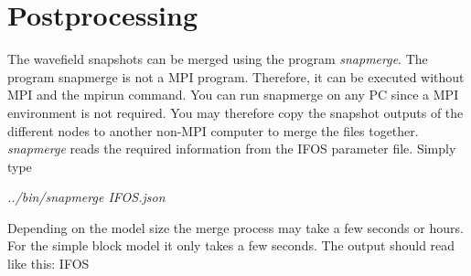 \section{Postprocessing}  
The wavefield snapshots can be merged using the program \textit{snapmerge}. The program snapmerge is not a MPI program. Therefore, it can be executed without MPI and the mpirun command. You can run snapmerge on any PC since a MPI environment is not required. You may therefore copy the snapshot outputs of the different nodes to another non-MPI computer to merge the files together. \textit{snapmerge} reads the required information from the IFOS parameter file. Simply type
\newline

\textit{../bin/snapmerge IFOS.json  }
\newline


Depending on the model size the merge process may take a few seconds or hours. For the simple block model it only takes a few seconds. The output should read like this:
{\color{blue}{\begin{verbatim}
 pressure (files: ./snap/test.bin.p.??? ).

 writing merged snapshot file to  ./snap/test.bin.p
 Opening snapshot files: ./snap/test.bin.p.???  ... finished.
 Copying... ... finished.
 Use
 xmovie n1=100 n2=100 < ./snap/test.bin.p loop=1 label1=Y label2=X title=%g
 to play movie.
\end{verbatim}}} 
IFOS